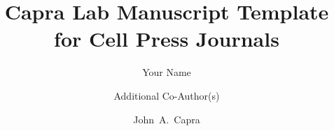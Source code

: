 

\title{Capra Lab Manuscript Template for Cell Press Journals}


\author[1,2]{Your Name}
\author[4]{Additional Co-Author(s)}
\author[1,2,3,5,*]{John~A.~Capra}
\affil[ ]{ } %
\renewcommand\Affilfont{\footnotesize} %
\setcounter{Maxaffil}{0} %
\date{} %

\newcommand{\makeAbstract}{
\renewcommand{\abstractname}{\color{sectioncolor}SUMMARY}
\begin{abstract}
\noindent \color{linkcolor}Cell Press articles begin with a ``summary'' rather than an abstract. This should be 150 words or less. Per \textit{Cell Genomics}: ``An effective summary includes the following elements: (1) a brief background of the question that avoids statements about how a process is not well understood; (2) a description of the results and approaches/model systems framed in the context of their conceptual interest; and (3) an indication of the broader significance of the work. We discourage novelty claims (e.g., use of the word “novel”) because they are overused, tend not to add meaning, and are difficult to verify. Please do not include references in the summary.''
\end{abstract}
}